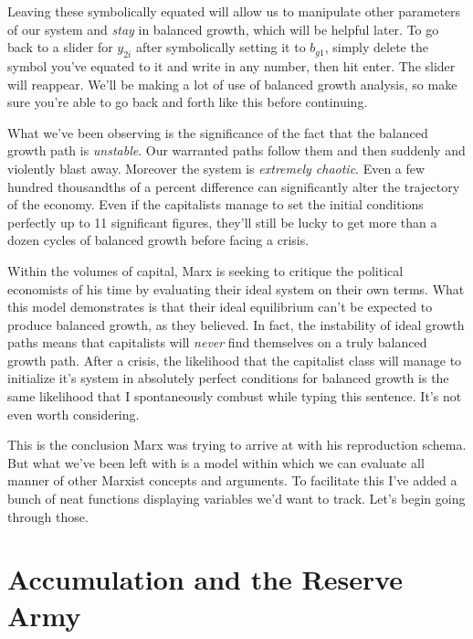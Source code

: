 \documentclass{article}
\theoremstyle{theorem}
\begin{document}
Leaving these symbolically equated will allow us to manipulate other parameters of our system and \emph{stay} in balanced growth, which will be helpful later. To go back to a slider for $y_{2i}$ after symbolically setting it to $b_{g1}$, simply delete the symbol you've equated to it and write in any number, then hit enter. The slider will reappear. We'll be making a lot of use of balanced growth analysis, so make sure you're able to go back and forth like this before continuing. \par 

What we've been observing is the significance of the fact that the balanced growth path is \emph{unstable}. Our warranted paths follow them and then suddenly and violently blast away. Moreover the system is \emph{extremely chaotic}. Even a few hundred thousandths of a percent difference can significantly alter the trajectory of the economy. Even if the capitalists manage to set the initial conditions perfectly up to 11 significant figures, they'll still be lucky to get more than a dozen cycles of balanced growth before facing a crisis. \par 
Within the volumes of capital, Marx is seeking to critique the political economists of his time by evaluating their ideal system on their own terms. What this model demonstrates is that their ideal equilibrium can't be expected to produce balanced growth, as they believed. In fact, the instability of ideal growth paths means that capitalists will \emph{never} find themselves on a truly balanced growth path. After a crisis, the likelihood that the capitalist class will manage to initialize it's system in absolutely perfect conditions for balanced growth is the same likelihood that I spontaneously combust while typing this sentence. It's not even worth considering. \par 
This is the conclusion Marx was trying to arrive at with his reproduction schema. But what we've been left with is a model within which we can evaluate all manner of other Marxist concepts and arguments. To facilitate this I've added a bunch of neat functions displaying variables we'd want to track. Let's begin going through those.
\section{Accumulation and the Reserve Army}
\end{document}

